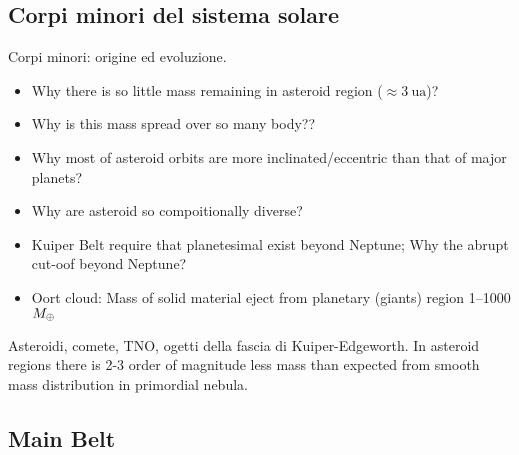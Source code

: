 \subsection{Corpi minori del sistema solare}

\begin{frame}{Corpi minori: origine ed evoluzione.}
\begin{itemize}
\item Why there is so little mass remaining in asteroid region ($\approx\SI{3}{\astronomicalunit}$)? 
\item Why is this mass spread over so many body??
\item Why most of asteroid orbits are more inclinated/eccentric than that of major planets?
\item Why are asteroid so compoitionally diverse?
\item Kuiper Belt require that planetesimal exist beyond Neptune; Why the abrupt cut-oof beyond Neptune?
\item Oort cloud: Mass of solid material eject from planetary (giants) region \numrange{1}{1000}$M_{\oplus}{}$
\end{itemize}
\end{frame}

\begin{wordonframe}{Asteroidi, comete, TNO, ogetti della fascia di Kuiper-Edgeworth.}
In asteroid regions there is 2-3 order of magnitude less mass than expected from smooth mass distribution in primordial nebula.
\end{wordonframe}

\subsection{Main Belt}

